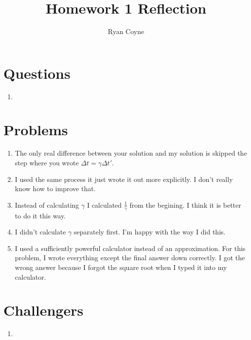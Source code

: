 \documentclass[12pt]{article}
\begin{document}
    \title{Homework 1 Reflection}
    \author{Ryan Coyne}
    \maketitle
    
    \section{Questions}
    \begin{enumerate}
        \item 
    \end{enumerate}

    \section{Problems}
    \begin{enumerate}
        \item  The only real difference between your solution and my solution is skipped the step where you wrote \(\Delta t = \gamma\Delta t'\). 
        \item I used the same process it just wrote it out more explicitly. I don't really know how to improve that.
        \item Instead of calculating \(\gamma\) I calculated \(\frac{1}{\gamma}\) from the begining. I think it is better to do it this way.
        \item I didn't calculate \(\gamma\) separately first. I'm happy with the way I did this.
        \item I used a sufficiently powerful calculator instead of an approximation. For this problem, I wrote everything except the final answer down correctly. I got the wrong answer because I forgot the square root when I typed it into my calculator. 
    \end{enumerate}

    \section{Challengers}
    \begin{enumerate}
        \item 
    \end{enumerate}
\end{document}
